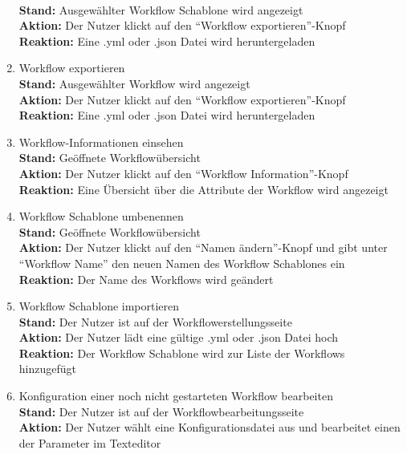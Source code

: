 \begin{enumerate}
        \\ \textbf{Stand:} Ausgewählter \gls{Workflow Schablone} wird angezeigt
        \\ \textbf{Aktion:} Der \gls{Nutzer} klickt auf den \enquote{Workflow exportieren}-Knopf
        \\ \textbf{Reaktion:} Eine .yml oder .json Datei wird heruntergeladen
    \item \gls{Workflow} exportieren
        \\ \textbf{Stand:} Ausgewählter \gls{Workflow} wird angezeigt
        \\ \textbf{Aktion:} Der \gls{Nutzer} klickt auf den \enquote{Workflow exportieren}-Knopf
        \\ \textbf{Reaktion:} Eine .yml oder .json Datei wird heruntergeladen
    \item \gls{Workflow}-Informationen einsehen
        \\ \textbf{Stand:} Geöffnete Workflowübersicht
        \\ \textbf{Aktion:} Der \gls{Nutzer} klickt auf den \enquote{Workflow Information}-Knopf
        \\ \textbf{Reaktion:} Eine Übersicht über die Attribute der \gls{Workflow} wird angezeigt
    \item \gls{Workflow Schablone} umbenennen
        \\ \textbf{Stand:} Geöffnete Workflowübersicht
        \\ \textbf{Aktion:} Der \gls{Nutzer} klickt auf den \enquote{Namen ändern}-Knopf und gibt unter \enquote{Workflow Name} den neuen Namen des \glspl{Workflow Schablone} ein
        \\ \textbf{Reaktion:} Der Name des Workflows wird geändert
    \item \gls{Workflow Schablone} importieren
        \\ \textbf{Stand:} Der \gls{Nutzer} ist auf der Workflowerstellungsseite 
        \\ \textbf{Aktion:} Der \gls{Nutzer} lädt eine gültige .yml oder .json Datei hoch 
        \\ \textbf{Reaktion:} Der \gls{Workflow Schablone} wird zur Liste der Workflows hinzugefügt
    \item Konfiguration einer noch nicht gestarteten \gls{Workflow} bearbeiten
        \\ \textbf{Stand:} Der \gls{Nutzer} ist auf der Workflowbearbeitungsseite
        \\ \textbf{Aktion:} Der \gls{Nutzer} wählt eine Konfigurationsdatei aus und bearbeitet einen der Parameter im Texteditor

\end{enumerate}
